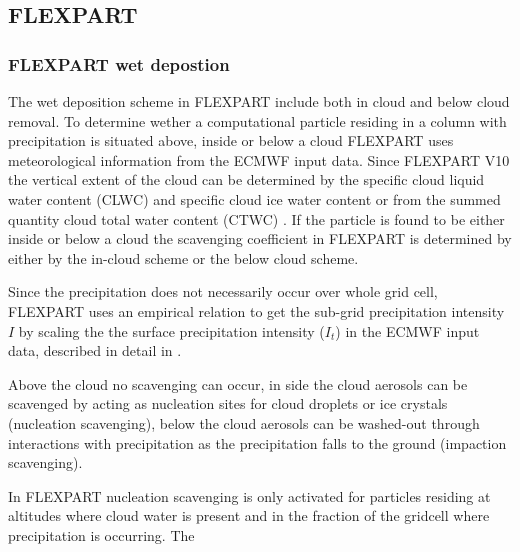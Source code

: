 
\subsection{FLEXPART}

\subsubsection{FLEXPART wet depostion}

The wet deposition scheme in FLEXPART include both in cloud and below cloud
removal. To determine wether a computational particle residing in a column with
precipitation is situated above, inside or below a cloud FLEXPART uses
meteorological information from the ECMWF input data. Since FLEXPART V10 the
vertical extent of the cloud can be determined by the specific cloud liquid
water content (CLWC) and specific cloud ice water content or from the summed
quantity cloud total water content (CTWC) \parencite{flexpart_wetdep}. If the
particle is found to be either inside or below a cloud the scavenging
coefficient in FLEXPART is determined by either by the in-cloud scheme or the
below cloud scheme.  

Since the precipitation does not necessarily occur over whole grid cell,
FLEXPART uses an empirical relation to get the sub-grid precipitation intensity
$ I $ by scaling the  the surface precipitation intensity ($ I_t $) in the ECMWF
input data, described in detail in \textcite{Flexpart-2005_ref_paper}.   

Above the cloud no scavenging can occur, in side the cloud aerosols can be
scavenged by acting as nucleation sites for cloud droplets or
ice crystals (nucleation scavenging), below the cloud aerosols can be washed-out
through interactions with precipitation as the precipitation falls to the ground
(impaction scavenging). 

In FLEXPART nucleation scavenging is only activated for particles residing at
altitudes where cloud water is present and in the fraction of the gridcell where
precipitation is occurring. The    


